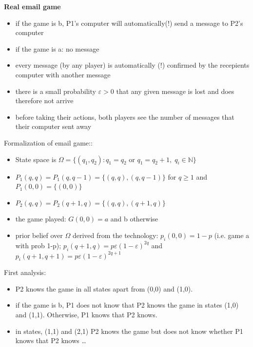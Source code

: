\documentclass{beamer}    %
\theoremstyle{plain}
\theoremstyle{definition}
\begin{document}
{\framebreak

\textbf{Real email game}
\begin{itemize}
\item if the game is b, P1's computer will automatically(!) send a
  message to P2's computer
\item if the game is a: no message
\item every message (by any player) is automatically (!)
  confirmed by the recepients computer with another message%
\item  there is a small probability $\varepsilon>0$ that
  any given message is lost and does therefore not arrive%
\item before taking their actions, both players see the number of messages that their computer sent away
\end{itemize}

\framebreak

Formalization of email game::
\begin{itemize}
\item  State space is $\Omega=\{(q_1,q_2):q_1=q_2\text{ or }q_1=q_2+1,\; q_i\in \mathbb{N}\}$%
\item $P_1(q,q)=P_1(q,q-1)=\{(q,q),(q,q-1)\}$ for $q\geq 1$ and $P_1(0,0)=\{(0,0)\}$ 
\item $P_2(q,q)=P_2(q+1,q)=\{(q,q),(q+1,q)\}$
\item the game played: $G(0,0)=a$ and b otherwise
\item prior belief over $\Omega$ derived from the technology: $p_i(0,0)=1-p$ (i.e. game a with prob 1-p); $p_i(q+1,q)=p\varepsilon (1-\varepsilon )^{2q}$ and $p_i(q+1,q+1)=p\varepsilon (1-\varepsilon )^{2q+1}$
\end{itemize}

\framebreak

First analysis:
\begin{itemize} 
\item P2 knows the game in all states apart from (0,0) and (1,0).
\item if the game is b, P1 does not know that P2 knows the game in states (1,0) and (1,1). Otherwise, P1 knows that P2 knows.
\item in states, (1,1) and (2,1) P2 knows the game but does not know whether P1 knows that P2 knows \dots
\end{itemize}

}
\end{document}
